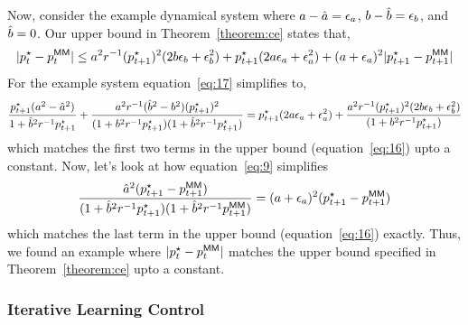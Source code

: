 Now, consider the example dynamical system where $a - \hat{a} = \epsilon_a$,
$b - \hat{b} = \epsilon_b$, and $\hat{b} = 0$. Our upper bound in
Theorem~\ref{theorem:ce} states that,
\begin{equation}
  \label{eq:16}
  |p^\star_{t} - p^\mathsf{MM}_t| \leq a^2r^{-1}(p^\star_{t+1})^2(2b\epsilon_b +
  \epsilon_b^2) + p^\star_{t+1}(2a\epsilon_a + \epsilon_a^2) + (a +
  \epsilon_a)^2|p^\star_{t+1} - p^\mathsf{MM}_{t+1}|
\end{equation}
For the example system equation~\eqref{eq:17} simplifies to,
\begin{align*}
  \frac{p^\star_{t+1}(a^2-
                                                                 \hat{a}^2)}{1
                                                                 +
                                                                 \hat{b}^2r^{-1}p^\star_{t+1}}
                                                                 +
                                                                 \frac{a^2r^{-1}(\hat{b}^2
                                                                 -
                                                                 b^2)(p^\star_{t+1})^2}{(1
                                                                 +
                                                                 b^2r^{-1}p^\star_{t+1})(1
                                                                 +
                                                                 \hat{b}^2r^{-1}p^\star_{t+1})}
  = p^\star_{t+1}(2a\epsilon_a + \epsilon_a^2)
                                                                 +
                                                                 \frac{a^2r^{-1}(p^\star_{t+1})^2(2b\epsilon_b
  + \epsilon_b^2)}{(1
                                                                 +
                                                                 b^2r^{-1}p^\star_{t+1})}
\end{align*}
which matches the first two terms in the upper bound
(equation~\eqref{eq:16}) upto a constant. Now, let's look at how
equation~\eqref{eq:9} simplifies
\begin{align*}
  \frac{\hat{a}^2(p^\star_{t+1} - p^\mathsf{MM}_{t+1})}{(1 +
                     \hat{b}^2r^{-1}p^\star_{t+1})(1 +
  \hat{b}^2r^{-1}p^\mathsf{MM}_{t+1})} = (a + \epsilon_a)^2(p^\star_{t+1} - p^\mathsf{MM}_{t+1})
\end{align*}
which matches the last term in the upper bound
(equation~\eqref{eq:16}) exactly. Thus, we found an example where
$|p^\star_t - p^\mathsf{MM}_t|$ matches the upper bound specified in
Theorem~\ref{theorem:ce} upto a constant.

\subsubsection{Iterative Learning Control}
\label{sec:iter-learn-contr-2}

